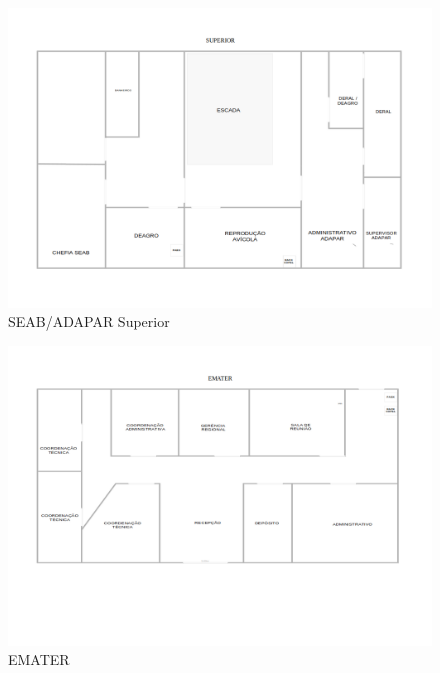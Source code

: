 \documentclass[	DIV=calc,%
							paper=a4,%
							fontsize=12pt,%
							onecolumn]{scrartcl}	 					%
\begin{document}
\begin{figure}[H]
	\centering
	\includegraphics[height=\textwidth,width=25cm,angle=-90,keepaspectratio]{SUPERIOR}
	\caption{SEAB/ADAPAR Superior}
	\label{SUPERIOR}	
\end{figure}

\begin{figure}[H]
	\centering
	\includegraphics[height=\textwidth,width=25cm,angle=-90,keepaspectratio]{EMATER}
	\caption{EMATER}
	\label{EMATER}	
\end{figure}
\end{document}
